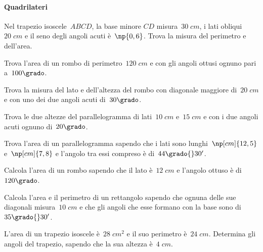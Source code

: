 \paragraph{Quadrilateri}
\begin{multicols}{2}
 \begin{esercizio}
\label{ese:C.26}
Nel trapezio isoscele~$ABCD$, la base minore $CD$ misura~$30\;\unit{cm}$, i lati obliqui~$20\;\unit{cm}$
e il seno degli angoli acuti è~$\np{0,6}$. Trova la misura del perimetro e dell'area.
\end{esercizio}

\begin{esercizio}
\label{ese:C.27}
Trova l'area di un rombo di perimetro~$120\;\unit{cm}$ e con gli angoli ottusi ognuno pari a~$100\grado$.
\end{esercizio}

\begin{esercizio}
\label{ese:C.28}
Trova la misura del lato e dell'altezza del rombo con diagonale maggiore di~$20\;\unit{cm}$ e con uno dei due angoli acuti di~$30\grado$.
\end{esercizio}

\begin{esercizio}
\label{ese:C.29}
Trova le due altezze del parallelogramma di lati~$10\;\unit{cm}$ e~$15\;\unit{cm}$ e con i due angoli acuti ognuno di~$20\grado$.
\end{esercizio}

\begin{esercizio}
\label{ese:C.30}
Trova l'area di un parallelogramma sapendo che i lati sono lunghi~$\np[cm]{12,5}$ e~$\np[cm]{7,8}$ e l'angolo tra essi compreso è di~$44\grado{}30'$.
\end{esercizio}

\begin{esercizio}
\label{ese:C.31}
Calcola l'area di un rombo sapendo che il lato è~$12\;\unit{cm}$ e l'angolo ottuso è di~$120\grado$.
\end{esercizio}

\begin{esercizio}
\label{ese:C.32}
Calcola l'area e il perimetro di un rettangolo sapendo che ognuna delle sue diagonali misura~$10\;\unit{cm}$
e che gli angoli che esse formano con la base sono di~$35\grado{}30'$.
\end{esercizio}

\begin{esercizio}
\label{ese:C.33}
L'area di un trapezio isoscele è~$28\;\unit{cm^2}$ e il suo perimetro è~$24\;\unit{cm}$. Determina gli angoli del trapezio,
sapendo che la sua altezza è~$4\;\unit{cm}$.
\end{esercizio}
\end{multicols}

